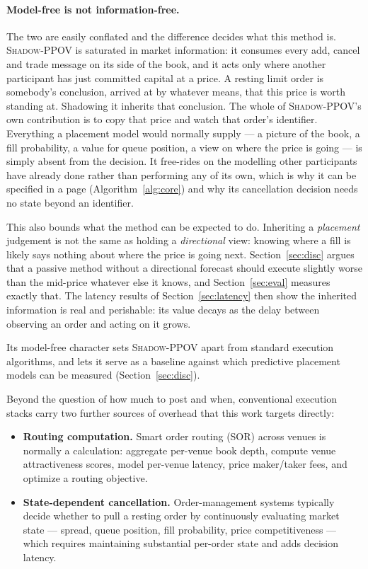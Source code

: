 \documentclass[11pt]{article}
\newcommand{\pov}{\textsc{Shadow-PPOV}}
\begin{document}
\paragraph{Model-free is not information-free.} The two are easily conflated and
the difference decides what this method is. \pov{} is saturated in market
information: it consumes every add, cancel and trade message on its side of the
book, and it acts only where another participant has just committed capital at a
price. A resting limit order is somebody's conclusion, arrived at by whatever
means, that this price is worth standing at. Shadowing it inherits that
conclusion. The whole of \pov{}'s own contribution is to copy that price and
watch that order's identifier. Everything a placement model would normally
supply --- a picture of the book, a fill probability, a value for queue
position, a view on where the price is going --- is simply absent from the
decision. It free-rides on the modelling other participants have already done
rather than performing any of its own, which is why it can be specified in a
page (Algorithm~\ref{alg:core}) and why its cancellation decision needs no state
beyond an identifier.

This also bounds what the method can be expected to do. Inheriting a
\emph{placement} judgement is not the same as holding a \emph{directional} view:
knowing where a fill is likely says nothing about where the price is going next.
Section~\ref{sec:disc} argues that a passive method without a directional
forecast should execute slightly worse than the mid-price whatever else it
knows, and Section~\ref{sec:eval} measures exactly that. The latency results of
Section~\ref{sec:latency} then show the inherited information is real and
perishable: its value decays as the delay between observing an order and acting
on it grows.

Its model-free character sets \pov{} apart from
standard execution algorithms, and lets it serve as a
baseline against which predictive placement models can be measured
(Section~\ref{sec:disc}).

Beyond the question of how much to post and when, conventional execution
stacks carry two further sources of overhead that this work targets directly:

\begin{itemize}[leftmargin=1.4em]
  \item \textbf{Routing computation.} Smart order routing (SOR) across venues
  is normally a calculation: aggregate per-venue book depth, compute venue
  attractiveness scores, model per-venue latency, price maker/taker fees, and
  optimize a routing objective.
  \item \textbf{State-dependent cancellation.} Order-management systems
  typically decide whether to pull a resting order by continuously evaluating
  market state --- spread, queue position, fill probability, price
  competitiveness --- which requires maintaining substantial per-order state
  and adds decision latency.
\end{itemize}
\end{document}
